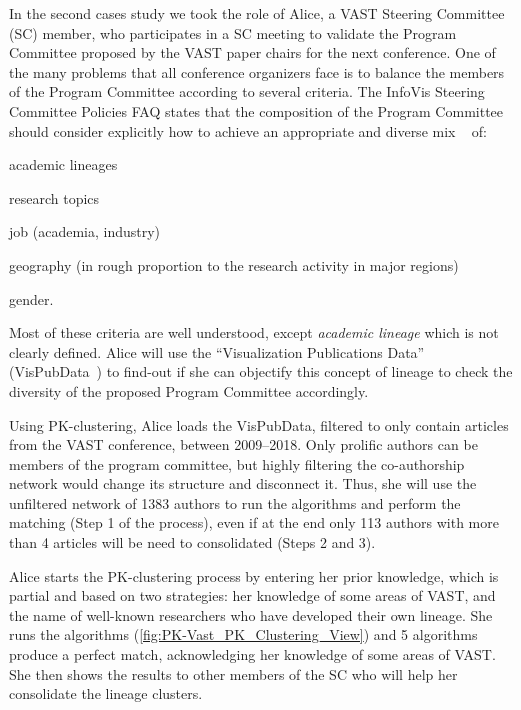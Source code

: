 In the second cases study we took the role of Alice, a VAST Steering Committee (SC) member, who participates in a SC meeting to validate the Program Committee proposed by the VAST paper chairs for the next conference.
One of the many problems that all conference organizers face is to balance the members of the Program Committee according to several criteria.
The InfoVis Steering Committee Policies FAQ states that the composition of the Program Committee should consider explicitly how to achieve an appropriate and diverse mix ~\cite{infovisfaq} of:
\begin{itemize*}
\item academic lineages
\item research topics
\item job (academia, industry)
\item geography (in rough proportion to the research activity in major regions)
\item gender.
\end{itemize*}
Most of these criteria are well understood, except \emph{academic lineage} which is not clearly defined.
Alice will use the ``Visualization Publications Data'' (VisPubData~\cite{VisPubData}) to find-out if she can objectify this concept of lineage to check the diversity of the proposed Program Committee accordingly.

Using PK-clustering, Alice loads the VisPubData, filtered to only contain articles from the VAST conference, between 2009--2018. Only prolific authors can be members of the program committee, but highly filtering the co-authorship network  would change its structure and disconnect it. Thus, she will use the unfiltered network of 1383 authors to run the algorithms and perform the matching (Step 1 of the process), even if at the end only 113 authors with more than 4 articles will be need to consolidated (Steps 2 and 3).

Alice starts the PK-clustering process by entering her prior knowledge, which is partial and based on two strategies: her knowledge of some areas of VAST, and the name of well-known researchers who have developed their own lineage. She runs the algorithms (\autoref{fig:PK-Vast_PK_Clustering_View}) and 5 algorithms produce a perfect match, acknowledging her knowledge of some areas of VAST. She then shows the results to other members of the SC who will help her consolidate the lineage clusters.

